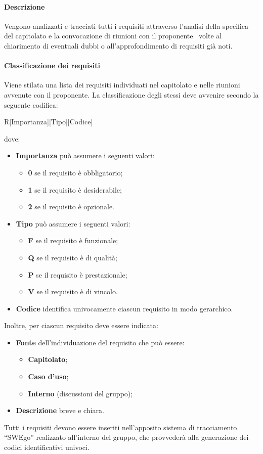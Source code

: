 \documentclass[../NormeDiProgetto.tex]{subfiles}
\begin{document}
			\paragraph{Descrizione\\}
				Vengono analizzati e tracciati tutti i requisiti attraverso l'analisi della
				specifica del capitolato e la convocazione di riunioni con il proponente
				\proponente\ volte al chiarimento di eventuali dubbi o all'approfondimento di
				requisiti già noti.
			\paragraph{Classificazione dei requisiti\\}
				Viene stilata una lista dei requisiti individuati nel capitolato e nelle
				riunioni avvenute con il proponente. La classificazione
				degli stessi deve avvenire secondo la seguente codifica:
				\begin{center}
					R[Importanza][Tipo][Codice]
				\end{center}
				dove:
				\begin{itemize}
					\item \textbf{Importanza} può assumere i seguenti valori:
					\begin{itemize}
						\item \textbf{0} se il requisito è obbligatorio;
						\item \textbf{1} se il requisito è desiderabile;
						\item \textbf{2} se il requisito è opzionale.
					\end{itemize}
					\item \textbf{Tipo} può assumere i seguenti valori:
					\begin{itemize}
						\item \textbf{F} se il requisito è funzionale;
						\item \textbf{Q} se il requisito è di qualità;
						\item \textbf{P} se il requisito è prestazionale;
						\item \textbf{V} se il requisito è di vincolo.
					\end{itemize}
					\item \textbf{Codice} identifica univocamente
					ciascun requisito in modo gerarchico.
				\end{itemize}
				Inoltre, per ciascun requisito deve essere indicata:
				\begin{itemize}
					\item \textbf{Fonte} dell'individuazione del requisito che può essere:
					\begin{itemize}
						\item \textbf{Capitolato};
						\item \textbf{Caso d'uso};
						\item \textbf{Interno} (discussioni del gruppo);
					\end{itemize}
					\item \textbf{Descrizione} breve e chiara.
				\end{itemize}
				Tutti i requisiti devono essere inseriti nell'apposito sistema di tracciamento ``SWEgo''
				realizzato all'interno del gruppo, che provvederà alla generazione
				dei codici identificativi univoci.
\end{document}
